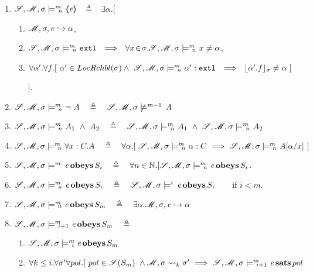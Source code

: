 \begin{definition}
\begin{enumerate}
\item
 \label{sect:semantics:assert:prt}
$\satMN \sigma m n {\inside \re} $ $\ \  \triangleq\ \  $ 
$\exists \alpha. [$  
\begin{enumerate}
\item
$ {\mathcal M}, \sigma, {\mathit{e}} \hookrightarrow \alpha$,
 \item 
 $\satMN {\sigma} m n {\extThis}\ \ \Longrightarrow\ \ \forall x\!\in\! \sigma. \satMN {\sigma} m n {x\neq \alpha}$,
 \item
$\forall \alpha'.\forall f.[\ \alpha' \in {\ensuremath{LocRchbl(\sigma)}} \wedge\    {\mathcal{S}}, {\mathcal M}, \sigma \models^{m} \!\!\!\!_{n} \ {\alpha':\mbox{\normalfont{\texttt{extl}}}} 
\ \ \Longrightarrow \ \  
  \lfloor \alpha'.f \rfloor_{\sigma} \neq \alpha     \ ]$ 
 \strut \hspace{.25cm} ].    \end{enumerate} 
 
  \item
 $\satMN \sigma m n {\neg \ A}\ \ \ \triangleq \ \ \   \notsatM   {\sigma} {m-1}  {A}$
\item
$\satMN \sigma m n {A_1\ \wedge\ A_2}\ \ \ \triangleq \ \ \   \satMN \sigma m n {A_1} \   \wedge \  \satMN \sigma m n {A_2}$
\item
\label{quant1}
$\satMN \sigma m n  {\all{x:C}{A}} \ \ \ \triangleq \ \ \   
\forall \alpha.[\   \satMN \sigma m n {\alpha:C}  \ \Longrightarrow   \ \satMN \sigma m n  {A[\alpha/x]} \ ] $

\item
\label{satObeys}
$\satM   \sigma m    {\obeys  \re {S_i}} \ \ \ \triangleq \ \ \   \forall n\in \mathbb{N}.[ \satMN  \sigma m n   {\obeys \re {S_i} }$.

\item
\label{satObeysMNa}
$\satMN  \sigma m n   {\obeys  \re {S_i}} \ \ \ \triangleq \ \ \   \satM  \sigma i    {\obeys  \re {S_i}} $\ \ \ \ if $i < m$.

\item
\label{satObeysMNb}
$\satMN  \sigma m 0   {\obeys  \re {S_m}} \ \ \ \triangleq \ \ \  \exists \alpha. \eval{\Mod}{\sigma}{{\re}}{\alpha}$

\item
\label{satObeysMNc}
$\satMN  \sigma m {i+1}   {\obeys  \re {S_m}} \ \ \ \triangleq \ \  $

\begin{enumerate}
\item
$ {\mathcal{S}}, {\mathcal M}, \sigma \models^{m} \!\!\!\!_{i} \ {\mathit{e}\, \textbf{obeys} \, S_m}$
\item 
$\forall k\leq i.\forall \sigma'\forall pol.[ \ pol\in\Spec(S_m) \ \wedge \Mod,\sigma \leadsto_k \sigma' \ 
\Longrightarrow \ \satMN  \sigma m {i+1}   {\sats  \re {pol}} $
\end{enumerate}


\end{enumerate}
\end{definition}
